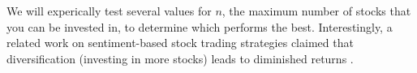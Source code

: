 We will experically test several values for $n$, the maximum number of stocks that you can be invested in, to determine which performs the best. Interestingly, a related work on sentiment-based stock trading strategies claimed that diversification (investing in more stocks) leads to diminished returns \cite{tradingSentimentPaper}.

